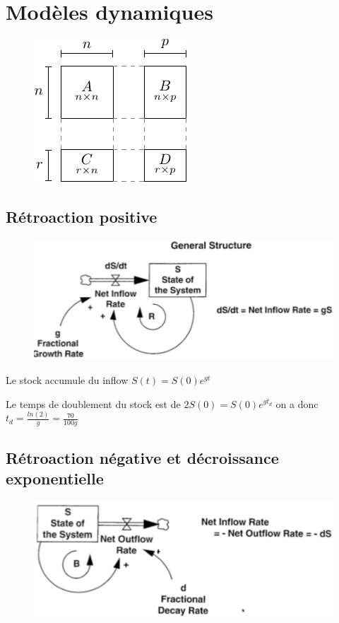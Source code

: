 \documentclass[resume]{subfiles}
\begin{document}
\section{Modèles dynamiques}
\begin{figure}[H]
\centering
\includegraphics[scale=1.5]{drwg_0.pdf}
\end{figure}
\subsection{Rétroaction positive}

\begin{figure}[H]
    \centering
    \includegraphics[width=1\columnwidth]{Figures/FDM_1.png}
\end{figure}

Le stock accumule du inflow $S(t)=S(0)e^{gt}$ 

Le temps de doublement du stock est de $2S(0)=S(0)e^{gt_d}$ on a donc $t_d=\frac{ln(2)}{g}=\frac{70}{100g}$

\subsection{Rétroaction négative et décroissance exponentielle}

\begin{figure}[H]
    \centering
    \includegraphics[width=1\columnwidth]{Figures/FDM_2.png}
\end{figure}
\end{document}
